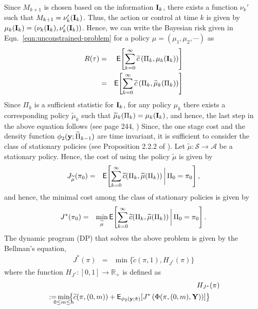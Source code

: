 \documentclass[journal]{IEEEtran}
\newcommand{\PRemPHI}{\phi_2({\bf y} ;\tilde{\pi})}
\newcommand{\EXP}[1]{\mathsf{E}\!\left[#1\right]}
\newcommand{\EXPm}[1]{\mathsf{E}_{\PRemPHI}\!\left[#1\right]}
\newcommand{\nn}{\nonumber \\}
\begin{document}
Since $M_{k+1}$ is chosen based on the information ${\bf I}_k$, there 
exists a function $\nu_k'$ such
that $M_{k+1} = \nu_k'({\bf I}_k)$. Thus, the action or control at time
$k$ is given by $\mu_k({\bf I}_k) = \left(\nu_k({\bf I}_k), \nu_k'({\bf
I}_k)\right)$. Hence, we can write the Bayesian risk given in 
Eqn.~\ref{eqn:unconstrained-problem} for a policy
$\mu=(\mu_1,\mu_2,\cdots)$ as 
\begin{eqnarray}
R(\tau) & = & \EXP{\sum_{k=0}^\infty \widetilde{c}\left(\Pi_k,\mu_k({\bf I}_k)\right)}\nn
& = & \EXP{\sum_{k=0}^\infty \widetilde{c}\left(\Pi_k,\widetilde{\mu}_k({\Pi}_k)\right)} 
\end{eqnarray}
Since $\Pi_k$ is a sufficient statistic for ${\bf I}_k$, for any policy $\mu_k$
there exists a corresponding policy $\widetilde{\mu}_k$ such that 
$\widetilde{\mu}_k(\Pi_k) = {\mu}_k({\bf I}_k)$, and hence, the  
last step in the above equation follows (see page 244, \cite{books.bertsekas00a}) 
Since, the one stage cost and the density function 
$\phi_2({\bf y};\widetilde{\Pi}_{k-1})$ are time invariant, it is sufficient to consider the
class of stationary policies 
(see Proposition 2.2.2 of \cite{books.bertsekas07b}). Let $\widetilde\mu:\mathcal{S}\to\mathcal{A}$ be a 
stationary policy. Hence, the cost of using the policy $\widetilde\mu$ is given by 
\begin{eqnarray*}
J_{\widetilde\mu}(\pi_0) & = &  \EXP{\sum_{k=0}^\infty \widetilde c(\Pi_k,\widetilde\mu(\Pi_k)) \bigg\arrowvert \Pi_0 = \pi_0},
\end{eqnarray*}
and hence, the minimal cost among the class of stationary
policies is given by
\begin{eqnarray*}
J^*(\pi_0) & = & \min_{\widetilde\mu} \EXP{\sum_{k=0}^\infty  \widetilde c(\Pi_k,\widetilde\mu(\Pi_k))
\bigg\arrowvert \Pi_0 = \pi_0}. 
\end{eqnarray*}
The dynamic program (DP) that solves the above problem is given by the Bellman's equation,
\begin{eqnarray}
\label{eqn:opt_J*_M*} 
J^*(\pi) & = & \min\bigg\{\widetilde c(\pi,1), H_{J^*}(\pi) \bigg\}
\end{eqnarray}
where the function $H_{J^*}:[0,1]\to\mathbb{R}_+$ is defined as
\begin{eqnarray}
& & H_{J^*}(\pi)\nn 
& := & \hspace{-5mm}\min_{0\le m \le
n} \hspace{-3mm}\left\{ \widetilde c(\pi,(0,m)) + \EXPm{
J^*\left(
\Phi(\pi,(0,m),{\bf Y})
\right) 
} \right\} \ \ \ \ 
\end{eqnarray}
\end{document}
